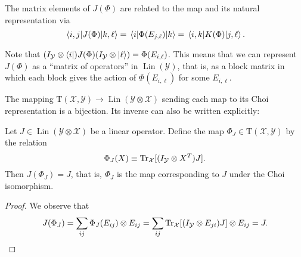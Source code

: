 \documentclass[12pt]{report}
\newcommand{\calY}{{\mathcal{Y}}}
\newcommand{\calX}{{\mathcal{X}}}
\newcommand{\rmT}{{\mathrm{T}}}
\DeclareMathOperator{\Lin}{Lin}
\begin{document}
\begin{prop}
	The matrix elements of $J(\Phi)$ are related to the map and its natural representation via
	\begin{equation}
		\mel{i,j}{J(\Phi)}{k,\ell}
		= \mel{i}{\Phi(E_{j,\ell})}{k}
		= \mel{i,k}{K(\Phi)}{j,\ell}.
	\end{equation}
\end{prop}

Note that $(I_{\calY}\otimes\bra i)J(\Phi)(I_{\calY}\otimes\ket \ell) = \Phi(E_{i,\ell})$.
This means that we can represent $J(\Phi)$ as a ``matrix of operators'' in $\Lin(\calY)$, that is, as a block matrix in which each block gives the action of $\Phi(E_{i,\ell})$ for some $E_{i,\ell}$.

The mapping $\rmT(\calX,\calY)\to \Lin(\calY\otimes \calX)$ sending each map to its Choi representation is a bijection. Its inverse can also be written explicitly:
\begin{prop}\label{prop:map_from_choi}
	Let $J\in\Lin(\calY\otimes\calX)$ be a linear operator.
	Define the map $\Phi_J\in\rmT(\calX,\calY)$ by the relation
	\begin{equation}
		\Phi_J(X) \equiv \Tr_\calX[(I_\calY\otimes X^T)J].
	\end{equation}
	Then $J(\Phi_J) = J$, that is, $\Phi_J$ is the map corresponding to $J$ under the Choi isomorphism.
\end{prop}
\begin{proof}
	We observe that
	\begin{equation}
		J(\Phi_J)
		= \sum_{ij} \Phi_J(E_{ij})\otimes E_{ij}
		= \sum_{ij} \Tr_\calX[(I_\calY\otimes E_{ji})J] \otimes E_{ij}
		= J.
	\end{equation}
\end{proof}
\end{document}
